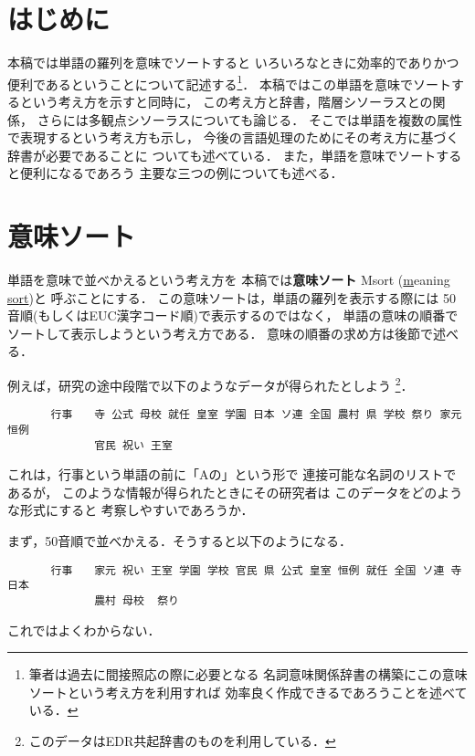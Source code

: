 

\maketitle


\section{はじめに}

本稿では単語の羅列を意味でソートすると
いろいろなときに効率的でありかつ便利であるということについて記述する\footnote{
筆者は過去に間接照応の際に必要となる
名詞意味関係辞書の構築にこの意味ソートという考え方を利用すれば
効率良く作成できるであろうことを述べている\cite{murata_indian_nlp}．}．
本稿ではこの単語を意味でソートするという考え方を示すと同時に，
この考え方と辞書，階層シソーラスとの関係，
さらには多観点シソーラスについても論じる．
そこでは単語を複数の属性で表現するという考え方も示し，
今後の言語処理のためにその考え方に基づく辞書が必要であることに
ついても述べている．
また，単語を意味でソートすると便利になるであろう
主要な三つの例についても述べる．

\section{意味ソート}
\label{sec:msort}

単語を意味で並べかえるという考え方を
本稿では{\bf 意味ソート} Msort (\underline{m}eaning \underline{sort})と
呼ぶことにする．
この意味ソートは，単語の羅列を表示する際には
50音順(もしくはEUC漢字コード順)で表示するのではなく，
単語の意味の順番でソートして表示しようという考え方である．
意味の順番の求め方は後節で述べる．

例えば，研究の途中段階で以下のようなデータが得られたとしよう
\footnote{
このデータはEDR共起辞書のものを利用している\cite{edr}．}．
{\small
\begin{verbatim}
　　　　行事　　寺 公式 母校 就任 皇室 学園 日本 ソ連 全国 農村 県 学校 祭り 家元 恒例 
　　　　　　　　官民 祝い 王室
\end{verbatim}
}
これは，行事という単語の前に「Aの」という形で
連接可能な名詞のリストであるが，
このような情報が得られたときにその研究者は
このデータをどのような形式にすると
考察しやすいであろうか．

まず，50音順で並べかえる．そうすると以下のようになる．
{\small
\begin{verbatim}
　　　　行事　　家元 祝い 王室 学園 学校 官民 県 公式 皇室 恒例 就任 全国 ソ連 寺 日本 
　　　　　　　　農村 母校  祭り 
\end{verbatim}
}
これではよくわからない．

